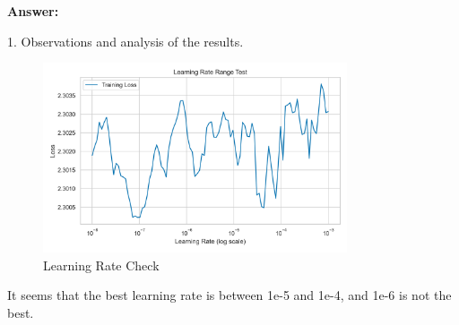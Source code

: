 \documentclass[11pt, oneside]{article}   	%
\begin{document}
\begin{answerbox} \textbf{Answer:} \vspace*{1cm}

1. Observations and analysis of the results.
\begin{figure}[h]
    \centering
    \includegraphics[width=0.8\textwidth]{problem_2/outputs/learning_rate_range_test.png}
    \caption{Learning Rate Check}
\end{figure}
\end{answerbox}

It seems that the best learning rate is between 1e-5 and 1e-4, and 1e-6 is not the best.
\end{document}
